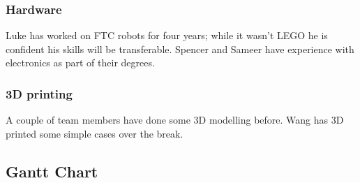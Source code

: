 \documentclass[onecolumn]{IEEEtran}
\begin{document}
\subsubsection{Hardware}

Luke has worked on FTC robots for four years; while it wasn’t LEGO he is confident his skills will be transferable. Spencer and Sameer have experience with electronics as part of their degrees.

\subsubsection{3D printing}

A couple of team members have done some 3D modelling before. Wang has 3D printed some simple cases over the break.

\subsection{Gantt Chart}

\end{document}
